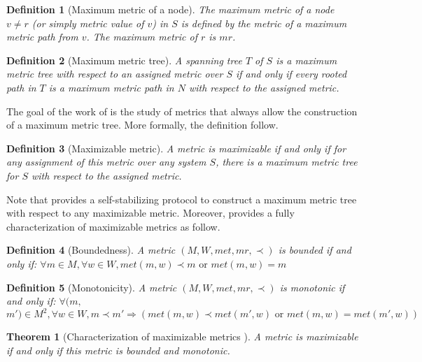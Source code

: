 \documentclass[11pt]{article}
\newtheorem{theo}{Theorem}
\newtheorem{defi}{Definition}
\newenvironment{theorem}[1]{\vspace{-0.25cm}\begin{theo}#1}{\end{theo}\vspace{-0.3cm}}
\newenvironment{definition}[1]{\vspace{-0.25cm}\begin{defi}#1}{\end{defi}\vspace{-0.3cm}}
\begin{document}
\begin{definition}[Maximum metric of a node]
The \emph{maximum metric of a node} $v\neq r$ (or simply \emph{metric value} of $v$) in $S$ is defined by the metric of a maximum metric path from $v$. The maximum metric of $r$ is $mr$. 
\end{definition}

\begin{definition}[Maximum metric tree]
A spanning tree $T$ of $S$ is a \emph{maximum metric tree} with respect to an assigned metric over $S$ if and only if every rooted path in $T$ is a maximum metric path in $N$ with respect to the assigned metric.
\end{definition}

The goal of the work of \cite{GS03j} is the study of metrics that always allow the construction of a maximum metric tree. More formally, the definition follow.

\begin{definition}[Maximizable metric]
A metric is \emph{maximizable} if and only if for any assignment of this metric over any system $S$, there is a maximum metric tree for $S$ with respect to the assigned metric.
\end{definition}

Note that \cite{GS99c} provides a self-stabilizing protocol to construct a maximum metric tree with respect to any maximizable metric. Moreover, \cite{GS03j} provides a fully characterization of maximizable metrics as follow.

\begin{definition}[Boundedness]
A metric $(M,W,met,mr,\prec)$ is \emph{bounded} if and only if: $\forall m \in M,\forall w\in W, met(m,w)\prec m \text{ or }met(m,w)=m$
\end{definition}

\begin{definition}[Monotonicity]
A metric $(M,W,met,mr,\prec)$ is \emph{monotonic} if and only if: $\forall (m,$ $m')\in M^2,\forall w\in W, m\prec m'\Rightarrow (met(m,w)\prec met(m',w)\text{ or }met(m,w)=met(m',w))$
\end{definition}

\begin{theorem}[Characterization of maximizable metrics \cite{GS03j}]
A metric is maximizable if and only if this metric is bounded and monotonic.
\end{theorem}
\end{document}
